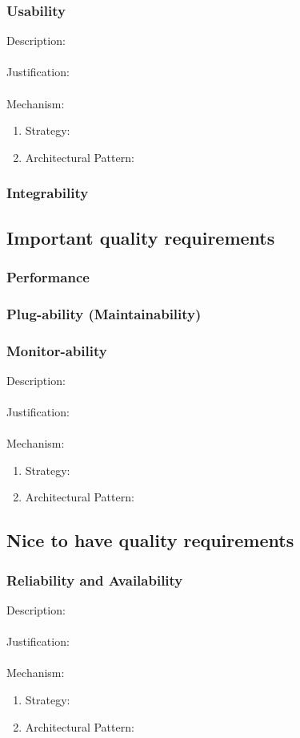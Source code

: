 \documentclass[a4paper,12pt,titlepage]{article}
\begin{document}
\subsubsection{Usability}%
	Description: \\\\
	Justification: \\\\
	Mechanism:
	\begin{enumerate}
		\item Strategy: 
		\item Architectural Pattern:
	\end{enumerate}
\subsubsection{Integrability}%
	
\newpage
\subsection{Important quality requirements}

\subsubsection{Performance}%
	
	\newpage
\subsubsection{Plug-ability (Maintainability)}%
	
	\newpage
\subsubsection{Monitor-ability}%
	Description: \\\\
	Justification: \\\\
	Mechanism:
	\begin{enumerate}
		\item Strategy: 
		\item Architectural Pattern:
	\end{enumerate}
\newpage
\subsection{Nice to have quality requirements}
\subsubsection{Reliability and Availability}%
	Description: \\\\
	Justification: \\\\
	Mechanism:
	\begin{enumerate}
		\item Strategy: 
		\item Architectural Pattern:
	\end{enumerate}
\end{document}
